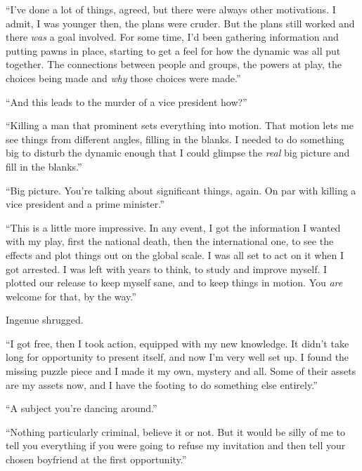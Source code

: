 ``I've done a lot of things, agreed, but there were always other motivations.  I admit, I was younger then, the plans were cruder.  But the plans still worked and there \emph{was} a goal involved.  For some time, I'd been gathering information and putting pawns in place, starting to get a feel for how the dynamic was all put together.  The connections between people and groups, the powers at play, the choices being made and \emph{why} those choices were made.''



``And this leads to the murder of a vice president how?''



``Killing a man that prominent sets everything into motion.  That motion lets me see things from different angles, filling in the blanks.  I needed to do something big to disturb the dynamic enough that I could glimpse the \emph{real }big picture and fill in the blanks.''



``Big picture.  You're talking about significant things, again.  On par with killing a vice president and a prime minister.''



``This is a little more impressive.  In any event, I got the information I wanted with my play, first the national death, then the international one, to see the effects and plot things out on the global scale.  I was all set to act on it when I got arrested.  I was left with years to think, to study and improve myself.  I plotted our release to keep myself sane, and to keep things in motion.  You \emph{are} welcome for that, by the way.''



Ingenue shrugged.



``I got free, then I took action, equipped with my new knowledge.  It didn't take long for opportunity to present itself, and now I'm very well set up.  I found the missing puzzle piece and I made it my own, mystery and all.  Some of their assets are my assets now, and I have the footing to do something else entirely.''



``A subject you're dancing around.''



``Nothing particularly criminal, believe it or not.  But it would be silly of me to tell you everything if you were going to refuse my invitation and then tell your chosen boyfriend at the first opportunity.''



